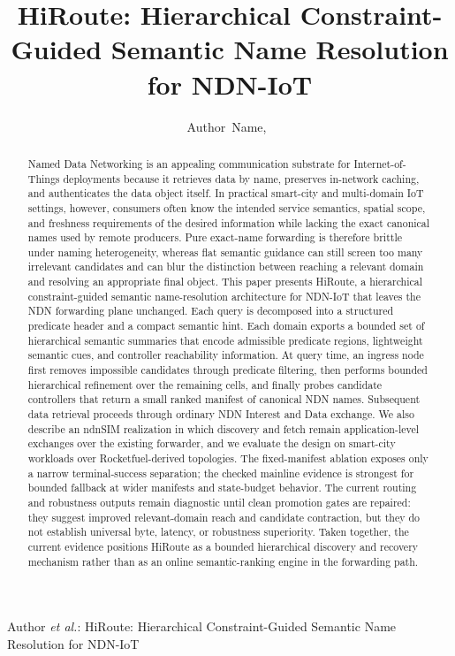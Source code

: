 \documentclass[journal]{IEEEtran}
\newcommand{\sysname}{HiRoute}
\begin{document}
\title{HiRoute: Hierarchical Constraint-Guided Semantic Name Resolution for NDN-IoT}

\author{Author~Name,~}

%
{Author \MakeLowercase{\textit{et al.}}: HiRoute: Hierarchical Constraint-Guided Semantic Name Resolution for NDN-IoT}

\maketitle

\begin{abstract}
Named Data Networking is an appealing communication substrate for Internet-of-Things deployments because it retrieves data by name, preserves in-network caching, and authenticates the data object itself. In practical smart-city and multi-domain IoT settings, however, consumers often know the intended service semantics, spatial scope, and freshness requirements of the desired information while lacking the exact canonical names used by remote producers. Pure exact-name forwarding is therefore brittle under naming heterogeneity, whereas flat semantic guidance can still screen too many irrelevant candidates and can blur the distinction between reaching a relevant domain and resolving an appropriate final object. This paper presents \sysname{}, a hierarchical constraint-guided semantic name-resolution architecture for NDN-IoT that leaves the NDN forwarding plane unchanged. Each query is decomposed into a structured predicate header and a compact semantic hint. Each domain exports a bounded set of hierarchical semantic summaries that encode admissible predicate regions, lightweight semantic cues, and controller reachability information. At query time, an ingress node first removes impossible candidates through predicate filtering, then performs bounded hierarchical refinement over the remaining cells, and finally probes candidate controllers that return a small ranked manifest of canonical NDN names. Subsequent data retrieval proceeds through ordinary NDN Interest and Data exchange. We also describe an ndnSIM realization in which discovery and fetch remain application-level exchanges over the existing forwarder, and we evaluate the design on smart-city workloads over Rocketfuel-derived topologies. The fixed-manifest ablation exposes only a narrow terminal-success separation; the checked mainline evidence is strongest for bounded fallback at wider manifests and state-budget behavior. The current routing and robustness outputs remain diagnostic until clean promotion gates are repaired: they suggest improved relevant-domain reach and candidate contraction, but they do not establish universal byte, latency, or robustness superiority. Taken together, the current evidence positions \sysname{} as a bounded hierarchical discovery and recovery mechanism rather than as an online semantic-ranking engine in the forwarding path.
\end{abstract}
\end{document}
